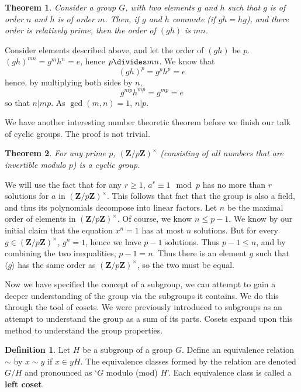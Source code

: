 \documentclass[12pt]{amsbook}
\makeatletter
\theoremstyle{plain}
\newtheorem{theorem}{Theorem}[chapter]
\theoremstyle{definition}
\newtheorem{definition}{Definition}
\renewenvironment{proof}[1][\proofname]{\par
  \pushQED{\qed}%
  \normalfont \topsep6\p@\@plus6\p@\relax
  \list{}{\leftmargin=0em
          \rightmargin=\leftmargin
          \settowidth{\itemindent}{\itshape#1}%
          \labelwidth=\itemindent}

  \item[\hskip\labelsep
        \itshape
    #1\@addpunct{.}]\ignorespaces
}{%
  \popQED\endlist\@endpefalse
}
\makeatother
\begin{document}
\begin{theorem}
    Consider a group $G$, with two elements $g$ and $h$ such that $g$ is of order $n$ and $h$ is of order $m$. Then, if $g$ and $h$ commute (if $gh = hg$), and there order is relatively prime, then the order of $(gh)$ is $mn$.
\end{theorem}
\begin{proof}
    Consider elements described above, and let the order of $(gh)$ be $p$. $(gh)^{mn} = g^mh^n = e$, hence $p \divides mn$. We know that
    \[ (gh)^p = g^ph^p = e \]
    hence, by multiplying both sides by $n$,
    \[ g^{mp}h^{mp} = g^{mp} = e \]
    so that $n | mp$. As $\gcd(m,n) = 1$, $n | p$.
\end{proof}

We have another interesting number theoretic theorem before we finish our talk of cyclic groups. The proof is not trivial.

\begin{theorem}
    For any prime $p$, $(\mathbf{Z}/p\mathbf{Z})^\times$ (consisting of all numbers that are invertible modulo $p$) is a cyclic group.
\end{theorem}
\begin{proof}
    We will use the fact that for any $r \geq 1$, $a^r \equiv 1 \mod{p}$ has no more than $r$ solutions for $a$ in $(\mathbf{Z}/p\mathbf{Z})^\times$. This follows that fact that the group is also a field, and thus its polynomials decompose into linear factors. Let $n$ be the maximal order of elements in $(\mathbf{Z}/p\mathbf{Z})^\times$. Of course, we know $n \leq p - 1$. We know by our initial claim that the equation $x^n = 1$ has at most $n$ solutions. But for every $g \in (\mathbf{Z}/p\mathbf{Z})^\times$, $g^n = 1$, hence we have $p-1$ solutions. Thus $p - 1 \leq n$, and by combining the two inequalities, $p-1 = n$. Thus there is an element $g$ such that $\langle g \rangle$ has the same order as $(\mathbf{Z}/p\mathbf{Z})^\times$, so the two must be equal.
\end{proof}

Now we have specified the concept of a subgroup, we can attempt to gain a deeper understanding of the group via the subgroups it contains. We do this through the tool of cosets. We were previously introduced to subgroups as an attempt to understand the group as a sum of its parts. Cosets expand upon this method to understand the group properties.

\begin{definition}
    Let $H$ be a subgroup of a group $G$. Define an equivalence relation $\sim$ by $x \sim y$ if $x \in yH$. The equivalence classes formed by the relation are denoted $G/H$ and pronounced as `$G$ modulo (mod) $H$'. Each equivalence class is called a {\bf left coset}. 
\end{definition}
\end{document}
